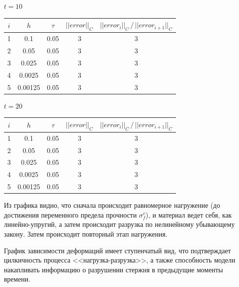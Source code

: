 \documentclass[12pt,a4paper]{article}
\begin{document}
\begin{enumerate}
    \centerline{$t = 10$}
    \vspace{0.5em}
    \begin{center}
      \begin{tabular}{|c|c|c|c|c|}
        \hline
        $i$ & $h$     & $\tau$ & $|| error ||_C$ & $|| error_i ||_C \, / \, || error_{i+1} ||_C$ \\
        \hline
        1   & 0.1     & 0.05   & 3 & 3 \\
        \hline 
        2   & 0.05    & 0.05   & 3 & 3 \\
        \hline
        3   & 0.025   & 0.05   & 3 & 3 \\
        \hline
        4   & 0.0025  & 0.05   & 3 & 3 \\
        \hline 
        5   & 0.00125 & 0.05   & 3 & 3 \\
        \hline
      \end{tabular}
    \end{center}

    \vspace{1cm}

    \centerline{$t = 20$}
    \vspace{0.5em}
    \begin{center}
      \begin{tabular}{|c|c|c|c|c|}
        \hline
        $i$ & $h$     & $\tau$ & $|| error ||_C$ & $|| error_i ||_C \, / \, || error_{i+1} ||_C$ \\
        \hline
        1   & 0.1     & 0.05   & 3 & 3 \\
        \hline 
        2   & 0.05    & 0.05   & 3 & 3 \\
        \hline
        3   & 0.025   & 0.05   & 3 & 3 \\
        \hline
        4   & 0.0025  & 0.05   & 3 & 3 \\
        \hline 
        5   & 0.00125 & 0.05   & 3 & 3 \\
        \hline
      \end{tabular}
    \end{center}

    \vspace{0.7em}

    Из графика видно, что сначала происходит равномерное нагружение (до достижения переменного предела прочности $\sigma_f^v$), и материал ведет себя, как линейно-упругий, а затем происходит разрузка по нелинейному убывающему закону. Затем происходит повторный этап нагружения. 

    График зависимости деформаций имеет ступенчатый вид, что подтверждает цилкичность процесса <<нагрузка-разрузка>>, а также способность модели накапливать информацию о разрушении стержня в предыдущие моменты времени. 


\end{enumerate}
\end{document}
